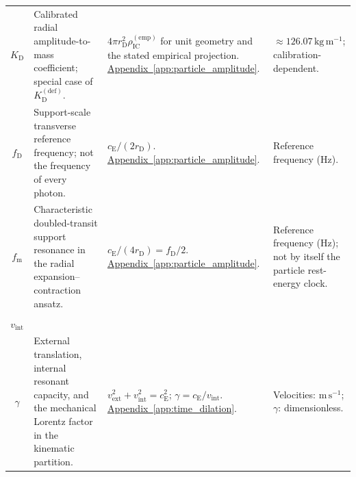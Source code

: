 \begin{longtable}{@{} c p{5.5cm} p{4cm} p{3.5cm} @{}}
$K_{\mathrm D}$ & {\raggedright Calibrated radial amplitude-to-mass coefficient; special case of $K_{\mathrm D}^{(\mathrm{def})}$.\par} & {\raggedright $4\pi r_{\mathrm D}^2\rho_{\mathrm{IC}}^{(\mathrm{emp})}$ for unit geometry and the stated empirical projection. \newline \hyperref[app:particle_amplitude]{Appendix~\ref*{app:particle_amplitude}}.\par} & {\raggedright $\approx126.07\,\mathrm{kg\,m^{-1}}$; calibration-dependent.\par} \\

$f_{\mathrm D}$ & {\raggedright Support-scale transverse reference frequency; not the frequency of every photon.\par} & {\raggedright $c_{\mathrm E}/(2r_{\mathrm D})$. \newline \hyperref[app:particle_amplitude]{Appendix~\ref*{app:particle_amplitude}}.\par} & {\raggedright Reference frequency ($\mathrm{Hz}$).\par} \\

$f_{\mathrm m}$ & {\raggedright Characteristic doubled-transit support resonance in the radial expansion--contraction ansatz.\par} & {\raggedright $c_{\mathrm E}/(4r_{\mathrm D})=f_{\mathrm D}/2$. \newline \hyperref[app:particle_amplitude]{Appendix~\ref*{app:particle_amplitude}}.\par} & {\raggedright Reference frequency ($\mathrm{Hz}$); not by itself the particle rest-energy clock.\par} \\

\begin{tabular}[c]{@{}c@{}}$v_{\mathrm{ext}}$ \\ $v_{\mathrm{int}}$ \\ $\gamma$\end{tabular} & {\raggedright External translation, internal resonant capacity, and the mechanical Lorentz factor in the kinematic partition.\par} & {\raggedright $v_{\mathrm{ext}}^2+v_{\mathrm{int}}^2=c_{\mathrm E}^2$; $\gamma=c_{\mathrm E}/v_{\mathrm{int}}$. \newline \hyperref[app:time_dilation]{Appendix~\ref*{app:time_dilation}}.\par} & {\raggedright Velocities: $\mathrm{m\,s^{-1}}$; $\gamma$: dimensionless.\par} \\



\end{longtable}
